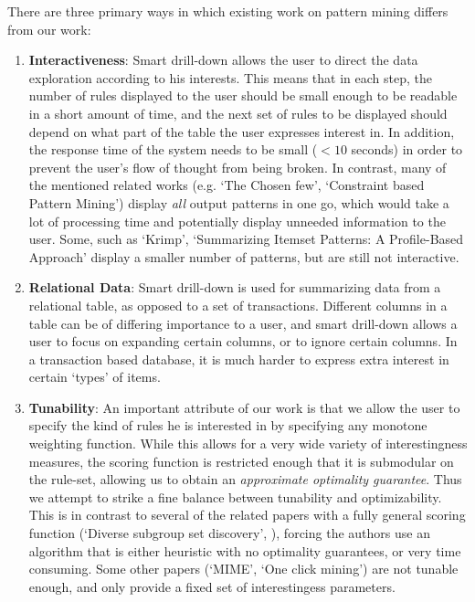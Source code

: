 \documentclass{article}
\begin{document}
There are three primary ways in which existing work on pattern mining differs from our work:
\begin{enumerate}
\item {\bf Interactiveness}: Smart drill-down allows the user to direct the data exploration according to his interests. This means that in each step, the number of rules displayed to the user should be small enough to be readable in a short amount of time, and the next set of rules to be displayed should depend on what part of the table the user expresses interest in. In addition, the response time of the system needs to be small ($< 10$ seconds) in order to prevent the user's flow of thought from being broken. In contrast, many of the mentioned related works (e.g. `The Chosen few', `Constraint based Pattern Mining') display {\em all} output patterns in one go, which would take a lot of processing time and potentially display unneeded information to the user. Some, such as `Krimp', `Summarizing Itemset Patterns: A Profile-Based Approach' display a smaller number of patterns, but are still not interactive. 

\item {\bf Relational Data}: Smart drill-down is used for summarizing data from a relational table, as opposed to a set of transactions. Different columns in a table can be of differing importance to a user, and smart drill-down allows a user to focus on expanding certain columns, or to ignore certain columns. In a transaction based database, it is much harder to express extra interest in certain `types' of items.  

\item {\bf Tunability}: An important attribute of our work is that we allow the user to specify the kind of rules he is interested in by specifying any monotone weighting function. While this allows for a very wide variety of interestingness measures, the scoring function is restricted enough that it is submodular on the rule-set, allowing us to obtain an {\em approximate optimality guarantee}. Thus we attempt to strike a fine balance between tunability and optimizability. This is in contrast to several of the related papers with a fully general scoring function (`Diverse subgroup set discovery', ), forcing the authors use an algorithm that is either heuristic with no optimality guarantees, or very time consuming. Some other papers (`MIME', `One click mining') are not tunable enough, and only provide a fixed set of interestingess parameters. 
\end{enumerate}
\end{document}
